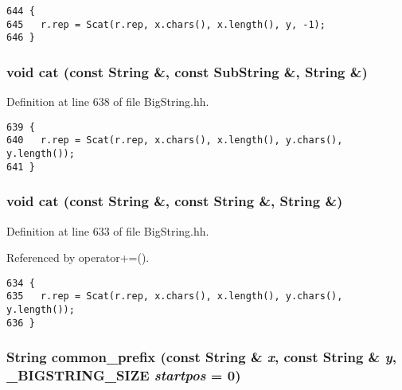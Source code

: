 \footnotesize\begin{verbatim}644 {
645   r.rep = Scat(r.rep, x.chars(), x.length(), y, -1);
646 }
\end{verbatim}\normalsize 
{}
\subsubsection{\setlength{\rightskip}{0pt plus 5cm}void cat (const String \&, const {\bf Sub\-String} \&, String \&)\hspace{0.3cm}{\tt  [friend]}}\label{classString_l2}




Definition at line 638 of file Big\-String.hh.



\footnotesize\begin{verbatim}639 {
640   r.rep = Scat(r.rep, x.chars(), x.length(), y.chars(), y.length());
641 }
\end{verbatim}\normalsize 
{}
\subsubsection{\setlength{\rightskip}{0pt plus 5cm}void cat (const String \&, const String \&, String \&)\hspace{0.3cm}{\tt  [friend]}}\label{classString_l1}




Definition at line 633 of file Big\-String.hh.

Referenced by operator+=().



\footnotesize\begin{verbatim}634 {
635   r.rep = Scat(r.rep, x.chars(), x.length(), y.chars(), y.length());
636 }
\end{verbatim}\normalsize 
{}
\subsubsection{\setlength{\rightskip}{0pt plus 5cm}String common\_\-prefix (const String \& {\em x}, const String \& {\em y}, {\bf \_\-BIGSTRING\_\-SIZE} {\em startpos} = 0)\hspace{0.3cm}{\tt  [friend]}}\label{classString_l39}




